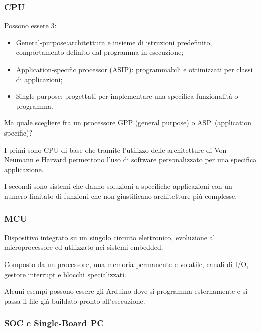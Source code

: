 \documentclass[
]{article}
\providecommand{\tightlist}{%
  \setlength{\itemsep}{0pt}\setlength{\parskip}{0pt}}
\begin{document}
\subsubsection{\texorpdfstring{{CPU}}{CPU}}\label{h.hrpqdpbzkc1p}

{Possono essere 3:}

\begin{itemize}
\tightlist
\item
  {General-purpose}{:architettura e insieme di istruzioni predefinito,
  comportamento definito dal programma in esecuzione;}
\item
  {Application-specific processor (ASIP)}{: programmabili e ottimizzati
  per classi di applicazioni;}
\item
  {Single-purpose}{: progettati per implementare una specifica
  funzionalità o programma.}
\end{itemize}

{}

{Ma quale scegliere fra un processore }{GPP }{(general purpose) o
}{ASP}{~(application specific)?}

{I primi sono CPU di base che tramite l'utilizzo delle architetture di
Von Neumann e Harvard permettono l'uso di software personalizzato per
una specifica applicazione.}

{I secondi sono sistemi che danno soluzioni a specifiche applicazioni
con un numero limitato di funzioni che non giustificano architetture più
complesse.}

\subsubsection{\texorpdfstring{{MCU}}{MCU}}\label{h.qv2hj2bn8as8}

{Dispositivo integrato su un singolo circuito elettronico, evoluzione al
microprocessore ed utilizzato nei sistemi embedded.}

{Composto da un processore, una memoria permanente e volatile, canali di
I/O, gestore interrupt e blocchi specializzati.}

{Alcuni esempi possono essere gli Arduino dove si programma esternamente
e si passa il file già buildato pronto all'esecuzione.}

\subsubsection{\texorpdfstring{{SOC e Single-Board
PC}}{SOC e Single-Board PC}}\label{h.s2knihybh3bv}
\end{document}
